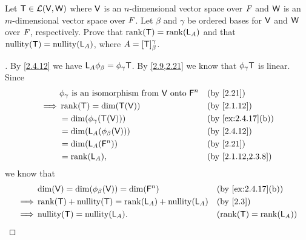 \setcounter{ex}{19}
\begin{ex}\label{ex:2.4.20}
	Let \(\mathsf{T} \in \mathcal{L}(\mathsf{V}, \mathsf{W})\) where \(\mathsf{V}\) is an \(n\)-dimensional vector space over \(\mathit{F}\) and \(\mathsf{W}\) is an \(m\)-dimensional vector space over \(\mathit{F}\).
	Let \(\beta\) and \(\gamma\) be ordered bases for \(\mathsf{V}\) and \(\mathsf{W}\) over \(\mathit{F}\), respectively.
	Prove that \(\rk{\T} = \rk{\L_A}\) and that \(\nt{\T} = \nt{\L_A}\), where \(A = [\mathsf{T}]_{\beta}^{\gamma}\).
\end{ex}

\begin{proof}[]
	By \cref{2.4.12} we have \(\mathsf{L}_A \phi_{\beta} = \phi_{\gamma} \mathsf{T}\).
	By \cref{2.9,2.21} we know that \(\phi_{\gamma} \mathsf{T}\) is linear.
	Since
	\begin{align*}
		         & \phi_{\gamma} \text{ is an isomorphism from } \V \text{ onto } \vs{F}^n &  & \by{2.21}         \\
		\implies & \rk{\T} = \dim(\T(\V))                                                  &  & \by{2.1.12}       \\
		         & = \dim(\phi_{\gamma}(\T(\V)))                                           &  & \by{ex:2.4.17}[b] \\
		         & = \dim(\L_A(\phi_{\beta}(\V)))                                          &  & \by{2.4.12}       \\
		         & = \dim(\L_A(\vs{F}^n))                                                  &  & \by{2.21}         \\
		         & = \rk{\L_A},                                                            &  & \by{2.1.12,2.3.8}
	\end{align*}
	we know that
	\begin{align*}
		         & \dim(\V) = \dim(\phi_{\beta}(\V)) = \dim(\vs{F}^n) &  & \by{ex:2.4.17}[b]     \\
		\implies & \rk{\T} + \nt{\T} = \rk{\L_A} + \nt{\L_A}          &  & \by{2.3}              \\
		\implies & \nt{\T} = \nt{\L_A}.                               &  & (\rk{\T} = \rk{\L_A})
	\end{align*}
\end{proof}

